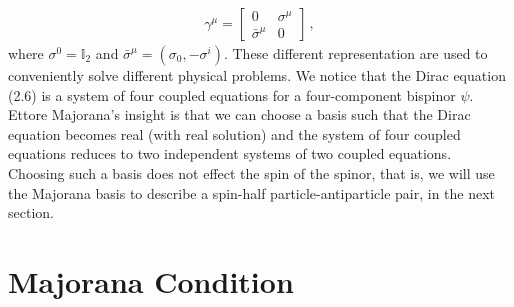 \documentclass[11pt, oneside]{book}
\theoremstyle{break}
\theoremstyle{break}
\newcommand{\bmat}[1]{\begin{bmatrix} #1 \end{bmatrix}}
\begin{document}
\begin{align}
\gamma^\mu = \bmat{0 & \sigma^\mu \\ \bar{\sigma}^\mu & 0}\,,
\end{align}
where $\sigma^0 = \mathbb{I}_2$ and $\bar{\sigma}^\mu = (\sigma_0, -\sigma^i)$. These different representation are used to conveniently solve different physical problems. We notice that the Dirac equation (2.6) is a system of four coupled equations for a four-component bispinor $\psi$. Ettore Majorana's insight is that we can choose a basis such that the Dirac equation becomes real (with real solution) and the system of four coupled equations reduces to two independent systems of two coupled equations. Choosing such a basis does not effect the spin of the spinor, that is, we will use the Majorana basis to describe a spin-half particle-antiparticle pair, in the next section.\\

\section{Majorana Condition}
\end{document}
